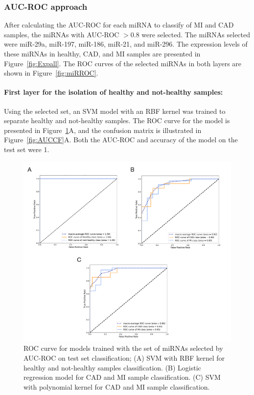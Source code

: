 \documentclass[sn-mathphys,Numbered]{sn-jnl}%
\theoremstyle{thmstyleone}%
\theoremstyle{thmstyletwo}%
\theoremstyle{thmstylethree}%
\begin{document}
\subsubsection{AUC-ROC approach}\label{auc-roc-approach}

After calculating the AUC-ROC for each miRNA to classify of MI and CAD
samples, the miRNAs with AUC-ROC $> 0.8$ were selected. The miRNAs
selected were miR-29a, miR-197, miR-186, miR-21, and miR-296. The
expression levels of these miRNAs in healthy, CAD, and MI samples are
presented in Figure~\ref{fig:Expall}. The ROC curves of the selected
miRNAs in both layers are shown in Figure~\ref{fig:miRROC}.

\paragraph{First layer for the isolation of healthy and not-healthy
samples:}\label{first-layer-for-the-isolation-of-healthy-and-not-healthy-samples-3}

Using the selected set, an SVM model with an RBF kernel was trained to
separate healthy and not-healthy samples. The ROC curve for the model is
presented in Figure~\ref{fig:AUCROC}A, and the confusion matrix is
illustrated in Figure~\ref{fig:AUCCF}A. Both the AUC-ROC and accuracy of
the model on the test set were 1.

\begin{figure}
\centering 
\includegraphics[width=0.95\linewidth]{AUC best model ROCs}
\caption{ROC curve for models trained with the set of miRNAs selected by AUC-ROC on test set classification; (A) SVM with RBF kernel for healthy and not-healthy samples classification. (B) Logistic regression model for CAD and MI sample classification. (C) SVM with polynomial kernel for CAD and MI sample classification. }\label{fig:AUCROC}
\end{figure}
\end{document}
